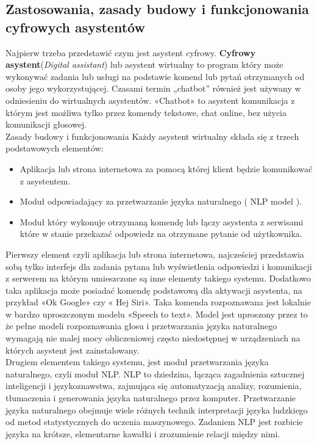 \subsection{Zastosowania, zasady budowy i funkcjonowania cyfrowych asystentów}

Najpierw trzeba przedstawić czym jest asystent cyfrowy. \textbf{Cyfrowy asystent}(\textit{Digital assistant}) lub asystent wirtualny to program który może wykonywać zadania lub usługi na podstawie komend lub pytań otrzymanych od osoby jego wykorzystującej. Czasami termin „chatbot” również jest używany w odniesieniu do wirtualnych asystentów. «Chatbot» to asystent komunikacja z którym jest możliwa tylko przez komendy tekstowe, chat online, bez użycia komunikacji głosowej. \\

Zasady budowy i funkcjonowania Każdy asystent wirtualny składa się z trzech podstawowych elementów: 

\begin{itemize}
	\item Aplikacja lub strona internetowa za pomocą której klient będzie komunikować z asystentem. 
	\item Moduł odpowiadający za przetwarzanie języka naturalnego ( NLP model ). 
	\item Moduł który wykonuje otrzymaną komendę lub łączy asystenta z serwisami które w stanie przekazać odpowiedz na otrzymane pytanie od użytkownika. 
\end{itemize}

Pierwszy element czyli aplikacja lub strona internetowa, najcześciej przedstawia sobą tylko interfejs dla zadania pytana lub wyświetlenia odpowiedzi i komunikacji z serwerem na którym umieszczone są inne elementy takiego systemu. Dodatkowo taka aplikacja może posiadać komendę podstawową dla aktywacji asystenta, na przykład «Ok Google» czy « Hej Siri». Taka komenda rozpoznawana jest lokalnie w bardzo uproszczonym modelu «Speech to text». Model jest uproszony przez to że pełne modeli rozpoznawania głosu i przetwarzania języka naturalnego wymagają nie malej mocy obliczeniowej często niedostępnej w urządzeniach na których asystent jest zainstalowany. \\

Drugiem elementem takiego systemu, jest moduł przetwarzania języka naturalnego, czyli moduł NLP. NLP to dziedzina, łącząca zagadnienia sztucznej inteligencji i językoznawstwa, zajmująca się automatyzacją analizy, rozumienia, tłumaczenia i generowania języka naturalnego przez komputer. Przetwarzanie języka naturalnego obejmuje wiele różnych technik interpretacji języka ludzkiego od metod statystycznych do uczenia maszynowego. Zadaniem NLP jest rozbicie języka na krótsze, elementarne kawałki i zrozumienie relacji między nimi. \\

